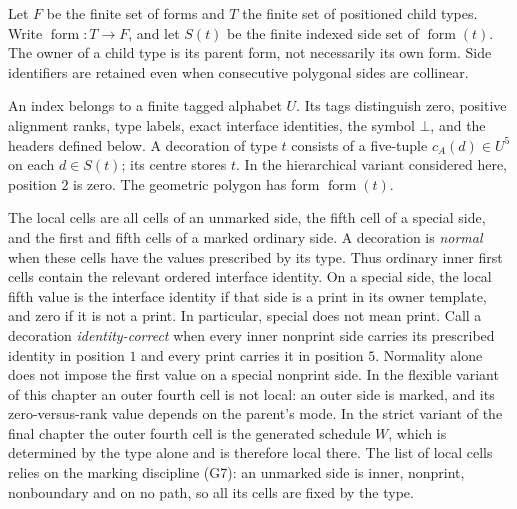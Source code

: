 \begin{definition}
\label{def:control/typed-decoration}
Let $F$ be the finite set of forms and $T$ the finite set of positioned child
types. Write $\operatorname{form}:T\to F$, and let $S(t)$ be the finite
indexed side set of $\operatorname{form}(t)$. The owner of a child type is
its parent form, not necessarily its own form. Side identifiers are retained
even when consecutive polygonal sides are collinear.

An index belongs to a finite tagged alphabet $U$. Its tags distinguish zero,
positive alignment ranks, type labels, exact interface identities, the symbol
$\bot$, and the headers defined below. A decoration of type $t$ consists
of a five-tuple $c_A(d)\in U^5$ on each $d\in S(t)$; its centre stores $t$.
In the hierarchical variant considered here, position $2$ is zero. The
geometric polygon has form $\operatorname{form}(t)$.

The local cells are all cells of an unmarked side, the fifth cell of a special
side, and the first and fifth cells of a marked ordinary side. A decoration
is \emph{normal} when these cells have the values prescribed by its type.
Thus ordinary inner first cells contain the relevant ordered interface identity.
On a special side, the local fifth value is the interface identity if that side
is a print in its owner template, and zero if it is not a print. In particular,
special does not mean print. Call a decoration \emph{identity-correct} when
every inner nonprint side carries its prescribed identity in position $1$
and every print carries it in position $5$. Normality alone does not impose
the first value on a special nonprint side. In the flexible variant of
this chapter an outer fourth cell is not local: an outer side is marked,
and its zero-versus-rank value depends on the parent's mode. In the strict
variant of the final chapter the outer fourth cell is the generated
schedule $W$, which is determined by the type alone and is therefore local
there. The list of local cells relies on the marking discipline (G7): an
unmarked side is inner, nonprint, nonboundary and on no path, so all its
cells are fixed by the type.
\end{definition}

